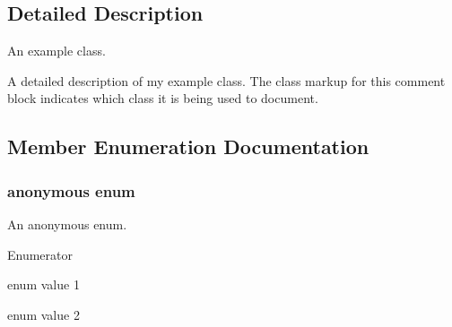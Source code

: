 \subsection{Detailed Description}
An example class. 

A detailed description of my example class. The class markup for this comment block indicates which class it is being used to document. 

\subsection{Member Enumeration Documentation}
\hypertarget{class_example_class_a03527d912021f436884478524799c002}{}\subsubsection[{anonymous enum}]{\setlength{\rightskip}{0pt plus 5cm}anonymous enum}\label{class_example_class_a03527d912021f436884478524799c002}
An anonymous enum. \begin{Desc}
\item[Enumerator]\par
\begin{description}
\item[{\em 
\hypertarget{class_example_class_a03527d912021f436884478524799c002a888f6de05ec2f5eafad41e86294cd55c}{}val1\label{class_example_class_a03527d912021f436884478524799c002a888f6de05ec2f5eafad41e86294cd55c}
}]enum value 1 \item[{\em 
\hypertarget{class_example_class_a03527d912021f436884478524799c002a415eb1c082ecbf38b9f987e7555924e8}{}val2\label{class_example_class_a03527d912021f436884478524799c002a415eb1c082ecbf38b9f987e7555924e8}
}]enum value 2 \end{description}
\end{Desc}
\hypertarget{class_example_class_a18344ab645e45ff0a5367165c1de4e49}{}
